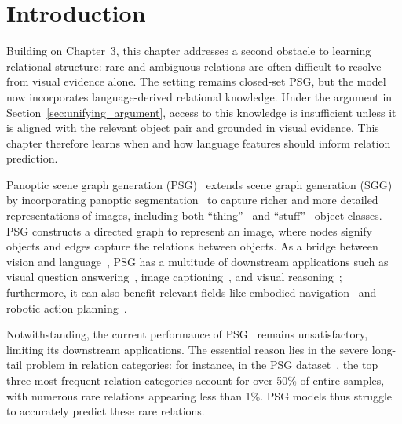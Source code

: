 \section{Introduction}
\label{vlprompt:sec:introduction}

Building on Chapter~3, this chapter addresses a second obstacle to learning relational structure: rare and ambiguous relations are often difficult to resolve from visual evidence alone.
The setting remains closed-set PSG, but the model now incorporates language-derived relational knowledge. Under the argument in Section~\ref{sec:unifying_argument}, access to this knowledge is insufficient unless it is aligned with the relevant object pair and grounded in visual evidence. This chapter therefore learns when and how language features should inform relation prediction.

Panoptic scene graph generation (PSG)~\citep{yang2022panoptic} extends scene graph generation (SGG)~\citep{lu2016visual} by incorporating panoptic segmentation~\citep{kirillov2019panoptic} to capture richer and more detailed representations of images, including both ``thing''~\citep{lin2014microsoft} and ``stuff''~\citep{caesar2018coco} object classes.
PSG constructs a directed graph to represent an image, where nodes signify objects and edges capture the relations between objects.
As a bridge between vision and language~\citep{zhu2022scene}, PSG has a multitude of downstream applications such as visual question answering~\citep{hildebrandt2020scene}, image captioning~\citep{gao2018image, chen2020say}, and visual reasoning~\citep{aditya2018image, shi2019explainable}; furthermore, it can also benefit relevant fields like embodied navigation~\citep{singh2023scene} and robotic action planning~\citep{amiri2022reasoning}.

Notwithstanding, the current performance of PSG~\citep{yang2022panoptic, zhou2023hilo, wang2023pair, li2023panoptic, hayder2024dsgg, lorenz2024fair, zhou2025openpsg} remains unsatisfactory, limiting its downstream applications.
The essential reason lies in the severe long-tail problem in relation categories: for instance, in the PSG dataset~\citep{yang2022panoptic}, the top three most frequent relation categories account for over 50\% of entire samples, with numerous rare relations appearing less than 1\%.
PSG models thus struggle to accurately predict these rare relations.

